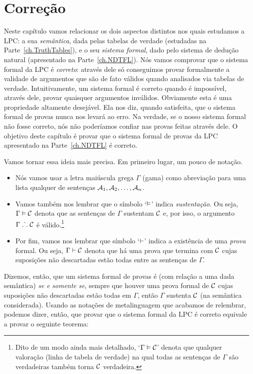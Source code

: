 \chapter{Correção}\label{ch:Soundness}

Neste capítulo vamos relacionar os dois aspectos distintos nos quais estudamos a LPC: a sua \textit{semântica}, dada pelas tabelas de verdade (estudadas  na Parte~\ref{ch.TruthTables}), e o seu \emph{sistema formal}, dado pelo sistema de dedução natural (apresentado na Parte~\ref {ch.NDTFL}).
Nós vamos comprovar que o sistema formal da LPC é \textit{correto}: através dele só conseguimos provar formalmente a validade de argumentos que são de fato válidos quando analisados via tabelas de verdade.
Intuitivamente, um sistema formal é correto quando é impossível, através dele, provar quaisquer argumentos inválidos.
Obviamente esta é uma propriedade altamente desejável.
Ela nos diz, quando satisfeita, que o sistema formal de provas nunca nos levará ao erro.
Na verdade, se o nosso sistema formal não fosse correto, nós não poderíamos confiar nas provas feitas através dele.
O objetivo deste capítulo é provar que o sistema formal de provas da LPC apresentado na Parte~\ref {ch.NDTFL} é correto.

Vamos tornar essa ideia mais precisa.
Em primeiro lugar, um pouco de notação.
\begin{itemize}
	\item Nós vamos usar a letra maiúscula grega $\Gamma$ (gama) como abreviação para uma lista qualquer de sentenças $\mathcal{A}_1, \mathcal{A}_2, \ldots, \mathcal{A}_n$.
	\item Vamos também nos lembrar que o símbolo `$\vDash$' indica \textit{sustentação}. Ou seja, $\Gamma \vDash \mathcal{C}$ denota que as sentenças de $\Gamma$ sustentam $\mathcal{C}$ e, por isso, o argumento $\Gamma \mathrel{\ldotp\dot{}\,\ldotp} \mathcal{C}$ é válido.\footnote{
		Dito de um modo ainda mais detalhado, `$\Gamma \vDash \mathcal{C}$' denota que qualquer valoração (linha de tabela de verdade) na qual todas as sentenças de $\Gamma$ são verdadeiras também torna $\mathcal{C}$ verdadeira.}
	\item Por fim, vamos nos lembrar que símbolo `$\vdash$' indica a existência de uma \textit{prova} formal. Ou seja, $\Gamma \vdash \mathcal{C}$ denota que há uma prova que termina com $\mathcal{C}$ cujas suposições não descartadas estão todas entre as sentenças de $\Gamma$.	
\end{itemize}
Dizemos, então, que um sistema formal de provas é  (com relação a uma dada semântica) \emph{se e somente se}, sempre que houver uma prova formal de $\mathcal{C}$ cujas suposições não descartadas estão todas em $\Gamma$, então $\Gamma$ sustenta $\mathcal{C}$ (na semântica considerada). 
Usando as notações de metalinguagem que acabamos de relembrar, podemos dizer, então, que provar que o sistema formal da LPC é correto equivale a provar o seguinte teorema:

